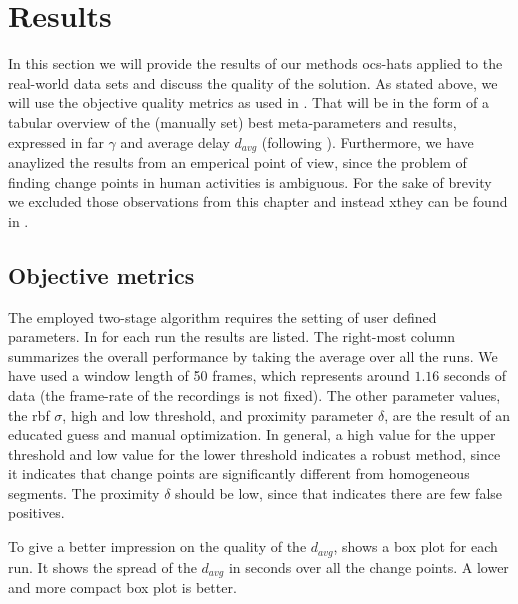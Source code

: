 \section{Results}\label{sec:real_world_results}
In this section we will provide the results of our methods \gls{ocs-hats} applied to the real-world data sets and discuss the quality of the solution.
As stated above, we will use the objective quality metrics as used in .
That will be in the form of a tabular overview of the (manually set) best meta-parameters and results, expressed in \gls{far} $\gamma$ and average delay $d_{avg}$ (following ).
Furthermore, we have anaylized the results from an emperical point of view, since the problem of finding change points in human activities is ambiguous.
For the sake of brevity we excluded those observations from this chapter and instead xthey can be found in .

\subsection{Objective metrics}
The employed two-stage algorithm requires the setting of user defined parameters.
In  for each run the results are listed.
The right-most column summarizes the overall performance by taking the average over all the runs.
We have used a window length of 50 frames, which represents around $1.16$ seconds of data (the frame-rate of the recordings is not fixed).
The other parameter values, \ie the \gls{rbf} $\sigma$, high and low threshold, and proximity parameter $\delta$, are the result of an educated guess and manual optimization.
In general, a high value for the upper threshold and low value for the lower threshold indicates a robust method, since it indicates that change points are significantly different from homogeneous segments.
The proximity $\delta$ should be low, since that indicates there are few false positives.

To give a better impression on the quality of the $d_{avg}$,  shows a box plot for each run.
It shows the spread of the $d_{avg}$ in seconds over all the change points.
A lower and more compact box plot is better.

